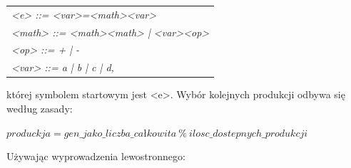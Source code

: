  \begin{center}
  \begin{tabular}{l}
    \textit{<e> ::= <var>=<math><var>} \\
	\textit{<math> ::= <math><math> | <var><op>} \\
	\textit{<op> ::= + | -} \\
	\textit{<var> ::= a | b | c | d,}
  \end{tabular}
 \end{center}

której symbolem startowym jest <e>. 
Wybór kolejnych produkcji odbywa się według zasady:
\begin{center} $produckja = gen\_jako\_liczba\_całkowita\ \%\ ilosc\_dostepnych\_produkcji$ \end{center}
Używając wyprowadzenia lewostronnego:

